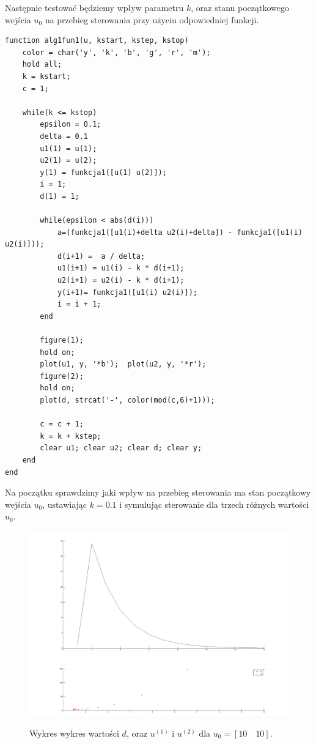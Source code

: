 \documentclass[a4paper,10pt]{article}
\begin{document}
Następnie testować będziemy wpływ parametru $k$, oraz stanu początkowego wejścia $u_0$ na przebieg sterowania przy użyciu odpowiedniej funkcji.
\begin{lstlisting}[caption=Funkcja testująca algorytm 1 dla obiektu 1.]
function alg1fun1(u, kstart, kstep, kstop)
    color = char('y', 'k', 'b', 'g', 'r', 'm');
    hold all;
    k = kstart;
    c = 1;
    
    while(k <= kstop)
        epsilon = 0.1;
        delta = 0.1
        u1(1) = u(1);
        u2(1) = u(2);
        y(1) = funkcja1([u(1) u(2)]);
        i = 1;
        d(1) = 1;
        
        while(epsilon < abs(d(i)))
            a=(funkcja1([u1(i)+delta u2(i)+delta]) - funkcja1([u1(i) u2(i)]));
            d(i+1) =  a / delta;
            u1(i+1) = u1(i) - k * d(i+1);
            u2(i+1) = u2(i) - k * d(i+1);
            y(i+1)= funkcja1([u1(i) u2(i)]);
            i = i + 1;
        end

        figure(1);
        hold on;
        plot(u1, y, '*b');  plot(u2, y, '*r');
        figure(2);
        hold on;
        plot(d, strcat('-', color(mod(c,6)+1)));
        
        c = c + 1;
        k = k + kstep;
        clear u1; clear u2; clear d; clear y;
    end
end
\end{lstlisting}
\newpage Na początku sprawdzimy jaki wpływ na przebieg sterowania ma stan początkowy wejścia $u_0$, ustawiając $k=0.1$ i symulując sterowanie dla trzech różnych wartości $u_0$.
\begin{figure}[!h]
    \centering
	\includegraphics[width=120mm]{CW4-alg1fun1-u10_10-k01-d.png}
	\includegraphics[width=120mm]{CW4-alg1fun1-u10_10-k01-u.png}
	\caption{Wykres wykres wartości $d$, oraz $u^{(1)}$ i $u^{(2)}$ dla $u_0=[10 \quad 10]$.}
    \label{fig:Rysunek}
\end{figure}
\end{document}
